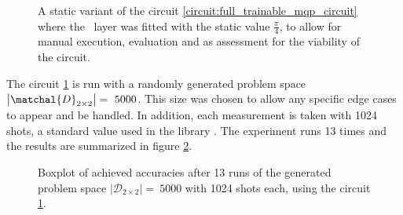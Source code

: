 \begin{figure}[!h]
    \centering
    \caption{A static variant of the circuit \ref{circuit:full_trainable_mqp_circuit} where the \rxgate\ layer was fitted with the static value $\frac{\pi}{4}$, to allow for manual execution, evaluation and as assessment for the viability of the circuit.}
    \label{circuit:static_mqo_circuit}
\end{figure}

The circuit \ref{circuit:static_mqo_circuit} is run with a randomly generated problem space $\left|\matchal{D}_{2\times2}\right| =\ 5000$. This size was chosen to allow any specific edge cases to appear and be handled. In addition, each measurement is taken with 1024 shots, a standard value used in the library . The experiment runs 13 times and the results are summarized in figure \ref{figure:boxplot_static_circuit_accuracies}.

\begin{figure}
    \centering
    \scalebox{0.9}{
        
    }
    \caption{Boxplot of achieved accuracies after 13 runs of the generated problem space $\left|\mathcal{D}_{2\times2}\right| =\ 5000$ with 1024 shots each, using the circuit \ref{circuit:static_mqo_circuit}.}
    \label{figure:boxplot_static_circuit_accuracies}
\end{figure}

